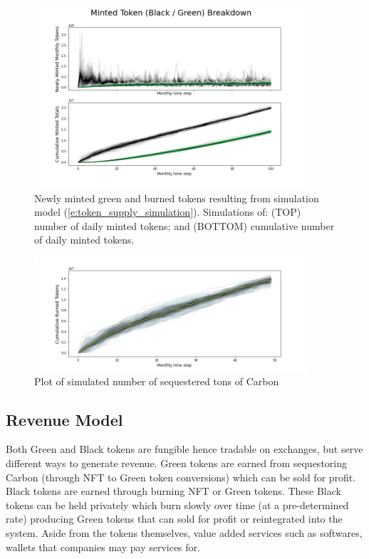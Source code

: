 \documentclass{article}
\begin{document}
\begin{figure}
\centering
\includegraphics[width=4in]{burned_minted.png}
\caption{Newly minted green and burned tokens resulting from simulation model (\ref{e:token_supply_simulation}). Simulations of: (TOP) number of daily minted tokens; and (BOTTOM) cumulative number of daily minted tokens.} 
\label{fig:burned_minted}
\end{figure} 

\begin{figure}
\centering
\includegraphics[width=4in]{burned_tokens.png}
\caption{Plot of simulated number of sequestered tons of Carbon } 
\label{fig:burned_tokens}
\end{figure} 

\subsection{Revenue Model}

Both Green and Black tokens are fungible hence tradable on exchanges, but serve different ways to generate revenue. Green tokens are earned from sequestoring Carbon (through NFT to Green token conversions) which can be sold for profit. Black tokens are earned through burning NFT or Green tokens. These Black tokens can be held privately which burn slowly over time (at a pre-determined rate) producing Green tokens that can sold for profit or reintegrated into the system. Aside from the tokens themselves, value added services such as softwares, wallets that companies may pay services for.
\end{document}
